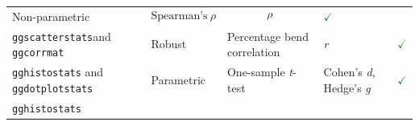 \documentclass[]{article}
\begin{document}
\begin{longtable}[]{@{}lllll@{}}
\begin{minipage}[t]{0.16\columnwidth}
Non-parametric\strut
\end{minipage} & \begin{minipage}[t]{0.31\columnwidth}\raggedright
\[\text{Spearman's}~ \rho\]\strut
\end{minipage} & \begin{minipage}[t]{0.12\columnwidth}\raggedright
\[\rho\]\strut
\end{minipage} & \begin{minipage}[t]{0.07\columnwidth}\raggedright
\textcolor{ForestGreen}{$\checkmark$}\strut
\end{minipage}\tabularnewline
\begin{minipage}[t]{0.20\columnwidth}\raggedright
\texttt{ggscatterstats}and \texttt{ggcorrmat}\strut
\end{minipage} & \begin{minipage}[t]{0.16\columnwidth}\raggedright
Robust\strut
\end{minipage} & \begin{minipage}[t]{0.31\columnwidth}\raggedright
Percentage bend correlation\strut
\end{minipage} & \begin{minipage}[t]{0.12\columnwidth}\raggedright
\emph{r}\strut
\end{minipage} & \begin{minipage}[t]{0.07\columnwidth}\raggedright
\textcolor{ForestGreen}{$\checkmark$}\strut
\end{minipage}\tabularnewline
\begin{minipage}[t]{0.20\columnwidth}\raggedright
\texttt{gghistostats} and \texttt{ggdotplotstats}\strut
\end{minipage} & \begin{minipage}[t]{0.16\columnwidth}\raggedright
Parametric\strut
\end{minipage} & \begin{minipage}[t]{0.31\columnwidth}\raggedright
One-sample \emph{t}-test\strut
\end{minipage} & \begin{minipage}[t]{0.12\columnwidth}\raggedright
Cohen's \emph{d}, Hedge's \emph{g}\strut
\end{minipage} & \begin{minipage}[t]{0.07\columnwidth}\raggedright
\textcolor{ForestGreen}{$\checkmark$}\strut
\end{minipage}\tabularnewline
\begin{minipage}[t]{0.20\columnwidth}\raggedright
\texttt{gghistostats}\strut
\end{minipage} & \begin{minipage}[t]{0.16\columnwidth}\raggedright

\end{minipage}
\end{longtable}
\end{document}
